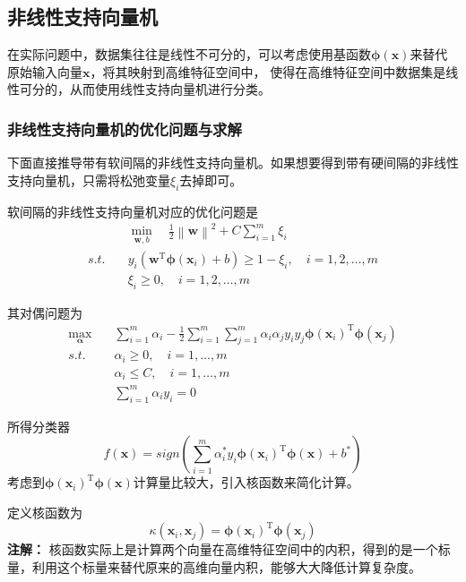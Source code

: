 \documentclass[withoutpreface,bwprint]{NoteBook}
\begin{document}
\subsection{非线性支持向量机}
在实际问题中，数据集往往是线性不可分的，可以考虑使用基函数$\bm{\phi}(\mathbf{x})$来替代原始输入向量$\mathbf{x}$，将其映射到高维特征空间中，
使得在高维特征空间中数据集是线性可分的，从而使用线性支持向量机进行分类。

\subsubsection{非线性支持向量机的优化问题与求解}
下面直接推导带有软间隔的非线性支持向量机。如果想要得到带有硬间隔的非线性支持向量机，只需将松弛变量$\xi_i$去掉即可。

软间隔的非线性支持向量机对应的优化问题是
\begin{align}
    \label{eq:非线性支持向量机的优化问题}
    & \min_{\mathbf{w},b} \quad \frac{1}{2}\left\| \mathbf{w} \right\|^2 + C \sum_{i=1}^{m} \xi_i \\
    s.t. \quad & y_i(\mathbf{w}^\mathrm{T} \bm{\phi}(\mathbf{x}_i) + b) \geq 1-\xi_i, \quad i=1,2,\dots,m \\
    & \xi_i \geq 0, \quad i=1,2,\dots,m
\end{align}

其对偶问题为
\begin{align}
    \label{eq:非线性支持向量机的对偶问题}
    \max_{\bm{\alpha}} \quad & \sum_{i=1}^{m} \alpha_i - \frac{1}{2} \sum_{i=1}^{m} \sum_{j=1}^{m} \alpha_i \alpha_j y_i y_j \bm{\phi}(\mathbf{x}_i)^\mathrm{T} \bm{\phi}(\mathbf{x}_j)  \\
    s.t. \quad & \alpha_i \geq 0, \quad i=1,\dots,m \\
            & \alpha_i \leq C, \quad i=1,\dots,m \\
            & \sum_{i=1}^{m} \alpha_i y_i = 0
\end{align}

所得分类器
\begin{equation}
    \label{eq:非线性支持向量机的分类器}
    f(\mathbf{x}) = sign \left( \sum_{i=1}^{m} \alpha_i^* y_i \bm{\phi}(\mathbf{x}_i)^\mathrm{T} \bm{\phi}(\mathbf{x}) + b^* \right)
\end{equation}
考虑到$\bm{\phi}(\mathbf{x}_i)^\mathrm{T} \bm{\phi}(\mathbf{x})$计算量比较大，引入核函数来简化计算。

定义核函数为
\begin{equation}
    \label{eq:核函数定义}
    \kappa (\mathbf{x}_i,\mathbf{x}_j) = \bm{\phi}(\mathbf{x}_i)^\mathrm{T} \bm{\phi}(\mathbf{x}_j)
\end{equation}
\textbf{注解：}
核函数实际上是计算两个向量在高维特征空间中的内积，得到的是一个标量，利用这个标量来替代原来的高维向量内积，能够大大降低计算复杂度。
\end{document}
